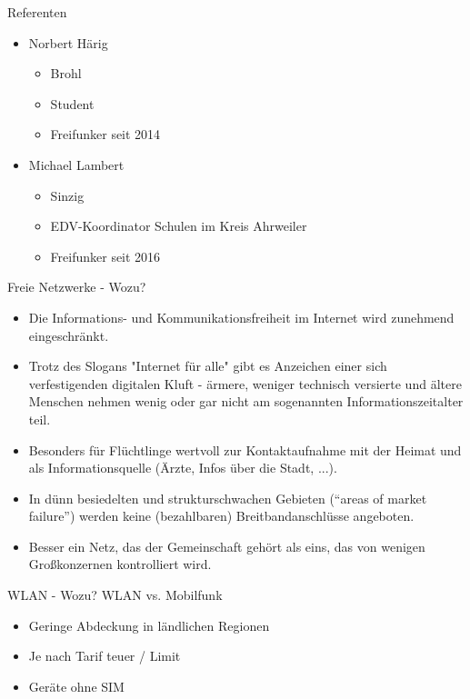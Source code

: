\documentclass{beamer}
\begin{document}
\begin{frame}{Referenten}
\begin{itemize}
	\item Norbert Härig
	\begin{itemize}
		\item Brohl
		\item Student
		\item Freifunker seit 2014
	\end{itemize}
	\item Michael Lambert
	\begin{itemize}
		\item Sinzig
		\item EDV-Koordinator Schulen im Kreis Ahrweiler
		\item Freifunker seit 2016
	\end{itemize}
\end{itemize}
\end{frame}

\begin{frame}{Freie Netzwerke - Wozu?}
\begin{itemize}
	\item Die Informations- und Kommunikationsfreiheit im Internet wird zunehmend eingeschränkt.
	\item Trotz des Slogans "Internet für alle" gibt es Anzeichen einer sich verfestigenden digitalen Kluft - ärmere, weniger technisch versierte und ältere Menschen nehmen wenig oder gar nicht am sogenannten Informationszeitalter teil.
	\item Besonders für Flüchtlinge wertvoll zur Kontaktaufnahme mit der Heimat und als Informationsquelle (Ärzte, Infos über die Stadt, ...).
	\item In dünn besiedelten und strukturschwachen Gebieten (“areas of market failure”) werden keine (bezahlbaren) Breitbandanschlüsse angeboten.
	\item Besser ein Netz, das der Gemeinschaft gehört als eins, das von wenigen Großkonzernen kontrolliert wird.
	
\end{itemize}
\end{frame}

\begin{frame}{WLAN - Wozu?}
WLAN vs. Mobilfunk
\begin{itemize}

\item Geringe Abdeckung in ländlichen Regionen
\item Je nach Tarif teuer / Limit
\item Geräte ohne SIM
\end{itemize}
\end{frame}
\end{document}
